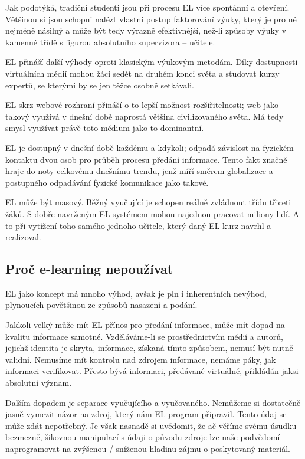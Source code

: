 Jak \cite{fongling_2006} podotýká, tradiční studenti jsou při procesu EL více spontánní a otevření. Většinou si jsou schopni nalézt vlastní postup faktorování výuky, který je pro ně nejméně násilný a může být tedy výrazně efektivnější, než-li způsoby výuky v kamenné třídě s figurou absolutního supervizora -- učitele.

EL přináší další výhody oproti klasickým výukovým metodám. Díky dostupnosti virtuálních médií mohou žáci sedět na druhém konci světa a studovat kurzy expertů, se kterými by se jen těžce osobně setkávali.

EL skrz webové rozhraní přináší o to lepší možnost rozšiřitelnosti; web jako takový využívá v dnešní době naprostá většina civilizovaného světa. Má tedy smysl využívat právě toto médium jako to dominantní.

EL je dostupný v dnešní době každému a kdykoli; odpadá závislost na fyzickém kontaktu dvou osob pro průběh procesu předání informace. Tento fakt značně hraje do noty celkovému dnešnímu trendu, jenž míří směrem globalizace a postupného odpadávání fyzické komunikace jako takové.

EL může být masový. Běžný vyučující je schopen reálně zvládnout třídu třiceti žáků. S dobře navrženým EL systémem mohou najednou pracovat miliony lidí. A to při vytížení toho samého jednoho učitele, který daný EL kurz navrhl a realizoval.

\subsection{Proč e-learning nepoužívat}

EL jako koncept má mnoho výhod, avšak je pln i inherentních nevýhod, plynoucích povětšinou ze způsobů nasazení a podání.

Jakkoli velký může mít EL přínos pro předání informace, může mít dopad na kvalitu informace samotné. Vzděláváme-li se prostřednictvím médií a autorů, jejichž identita je skryta, informace, získaná tímto způsobem, nemusí být nutně validní. Nemusíme mít kontrolu nad zdrojem informace, nemáme páky, jak informaci verifikovat. Přesto bývá informaci, předávané virtuálně, přikládán jaksi absolutní význam.

Dalším dopadem je separace vyučujícího a vyučovaného. Nemůžeme si dostatečně jasně vymezit názor na zdroj, který nám EL program připravil. Tento údaj se může zdát nepotřebný. Je však nasnadě si uvědomit, že ač věříme svému úsudku bezmezně, šikovnou manipulací s údaji o původu zdroje lze naše podvědomí naprogramovat na zvýšenou / sníženou hladinu zájmu o poskytovaný materiál.

